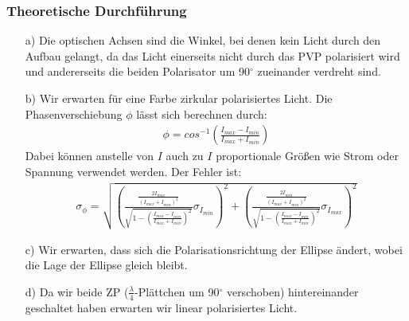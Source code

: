 \documentclass[12pt]{scrartcl}
\begin{document}
\subsubsection{Theoretische Durchführung}
\begin{enumerate}
\item[a)]
Die optischen Achsen sind die Winkel, bei denen kein Licht durch den Aufbau gelangt, da das Licht einerseits nicht durch das PVP polarisiert wird und andererseits die beiden Polarisator um 90$^\circ$ zueinander verdreht sind.
\item[b)]
Wir erwarten für eine Farbe zirkular polarisiertes Licht.
Die Phasenverschiebung $\phi$ lässt sich berechnen durch:
\begin{align}
\phi = cos^{-1}\left(\frac{I_{max}-I_{min}}{I_{max}+I_{min}}\right)
\label{eqn:a_5_b}
\end{align}
Dabei können anstelle von $I$ auch zu $I$ proportionale Größen wie Strom oder Spannung verwendet werden.
Der Fehler ist:
\begin{align}
\sigma_{\phi} = \sqrt{
\left(\frac{\frac{2I_{max}}{(I_{max}+I_{min})^2}}{\sqrt{1-\left(\frac{I_{max}-I_{min}}{I_{max}+
I_{min}}\right)^2}}\sigma_{I_{min}}\right)^2+
\left(\frac{\frac{2I_{min}}{(I_{max}+I_{min})^2}}{\sqrt{1-\left(\frac{I_{max}-I_{min}}{I_{max}+
I_{min}}\right)^2}}\sigma_{I_{max}}\right)^2}
\label{eqn:a_5_b_sigma}
\end{align}
\item[c)]
Wir erwarten, dass sich die Polarisationsrichtung der Ellipse ändert, wobei die Lage der Ellipse gleich bleibt.
\item[d)]
Da wir beide ZP ($\frac{\lambda}{4}$-Plättchen um 90$^\circ$ verschoben) hintereinander geschaltet haben erwarten wir linear polarisiertes Licht.
\end{enumerate}
\end{document}
